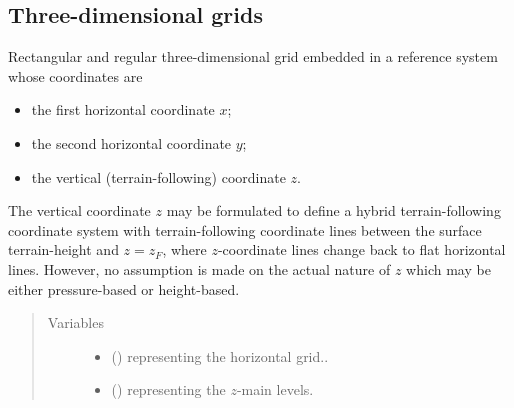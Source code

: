 \documentclass[letterpaper,10pt,english]{sphinxmanual}
\begin{document}
\subsection{Three-dimensional grids}
\label{\detokenize{api:three-dimensional-grids}}

\begin{fulllineitems}
\label{\detokenize{api:grids.grid_xyz.GridXYZ}}
Rectangular and regular three-dimensional grid embedded in a reference system whose coordinates are
\begin{itemize}
\item {} 
the first horizontal coordinate \(x\);

\item {} 
the second horizontal coordinate \(y\);

\item {} 
the vertical (terrain-following) coordinate \(z\).

\end{itemize}

The vertical coordinate \(z\) may be formulated to define a hybrid terrain-following coordinate system
with terrain-following coordinate lines between the surface terrain-height and \(z = z_F\), where
\(z\)-coordinate lines change back to flat horizontal lines. However, no assumption is made on the actual
nature of \(z\) which may be either pressure-based or height-based.
\begin{quote}\begin{description}
\item[{Variables}] \leavevmode\begin{itemize}
\item {} 
 () \textendash{}  representing the horizontal grid..

\item {} 
 () \textendash{} {\hyperref[\detokenize{api:grids.axis.Axis}]{}} representing the \(z\)-main levels.


\end{itemize}
\end{description}
\end{quote}
\end{fulllineitems}
\end{document}
